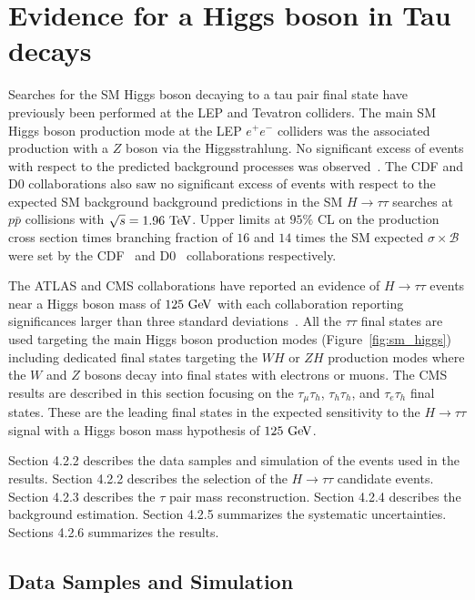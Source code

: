 \newpage 

\section{Evidence for a Higgs boson in Tau decays}

Searches for the SM Higgs boson decaying to a tau pair final state have previously been performed at the LEP and Tevatron colliders. The main SM Higgs boson production mode at the LEP $e^{+}e^{-}$ colliders was the associated production with a $Z$ boson via the Higgsstrahlung. No significant excess of events with respect to the predicted background processes was observed~\cite{Barate:2000ts,Abbiendi:2000ac,Achard:2001pj,Abdallah:2003ip}. The CDF and D$0$ collaborations also saw no significant excess of events with respect to the expected SM background background predictions in the SM $H \rightarrow \tau\tau$ searches at $p\bar{p}$ collisions with $\sqrt{s}=1.96~\mathrm{Te\kern -0.1em V}$. Upper limits at $95\%$ CL on the production cross section times branching fraction of $16$ and $14$ times the SM expected $\sigma \times \mathcal{B}$ were set by the CDF~\cite{Aaltonen:2012jh} and D$0$~\cite{Abazov:2012zj} collaborations respectively. 

The ATLAS and CMS collaborations have reported an evidence of $H\rightarrow\tau\tau$ events near a Higgs boson mass of $125~\mathrm{Ge\kern -0.1em V}$ with each collaboration reporting significances larger than three standard deviations~\cite{Aad:2015vsa,Chatrchyan:2014nva}. All the $\tau\tau$ final states are used targeting the main Higgs boson production modes (Figure~\ref{fig:sm_higgs}) including dedicated final states targeting the $WH$ or $ZH$ production modes where the $W$ and $Z$ bosons decay into final states with electrons or muons. The CMS results are described in this section focusing on the $\tau_{\mu}\tau_{h}$, $\tau_{h}\tau_{h}$, and $\tau_{e}\tau_{h}$ final states. These are the leading final states in the expected sensitivity to the $H \rightarrow \tau\tau$ signal with a Higgs boson mass hypothesis of $125~\mathrm{Ge\kern -0.1em V}$. 

Section 4.2.2 describes the data samples and simulation of the events used in the results. Section 4.2.2 describes the selection of the $H\rightarrow\tau\tau$ candidate events. Section 4.2.3 describes the $\tau$ pair mass reconstruction. Section 4.2.4 describes the background estimation. Section 4.2.5 summarizes the systematic uncertainties. Sections 4.2.6 summarizes the results.

\subsection{Data Samples and Simulation}

